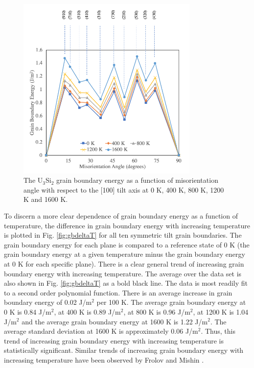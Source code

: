 \documentclass[review]{elsarticle}
\begin{document}
\begin{figure}[h]
 \centering
 \includegraphics[width=0.8\textwidth]{gb_vs_T.png} 
 \caption{The U$_{3}$Si$_{2}$ grain boundary energy as a function of misorientation angle with respect to the [100] tilt axis at 0 K, 400 K, 800 K, 1200 K and 1600 K.}
 \label{fig:gbtemp}
\end{figure}

\FloatBarrier

To discern a more clear dependence of grain boundary energy as a function of temperature, the difference in grain boundary energy with increasing temperature is plotted in Fig. \ref{fig:gbdeltaT} for all ten symmetric tilt grain boundaries. The grain boundary energy for each plane is compared to a reference state of 0 K (the grain boundary energy at a given temperature minus the grain boundary energy at 0 K for each specific plane). There is a clear general trend of increasing grain boundary energy with increasing temperature. The average over the data set is also shown in Fig. \ref{fig:gbdeltaT} as a bold black line. The data is most readily fit to a second order polynomial function. There is an average increase in grain boundary energy of 0.02 J/m$^{2}$ per 100 K. The average grain boundary energy at 0 K is 0.84 J/m$^{2}$, at 400 K is 0.89 J/m$^{2}$, at 800 K is 0.96 J/m$^{2}$, at 1200 K is 1.04 J/m$^{2}$ and the average grain boundary energy at 1600 K is 1.22 J/m$^{2}$. The average standard deviation at 1600 K is approximately 0.06 J/m$^{2}$. Thus, this trend of increasing grain boundary energy with increasing temperature is statistically significant. Similar trends of increasing grain boundary energy with increasing temperature have been observed by Frolov and Mishin \cite{frolov2012}. 
 
\end{document}

